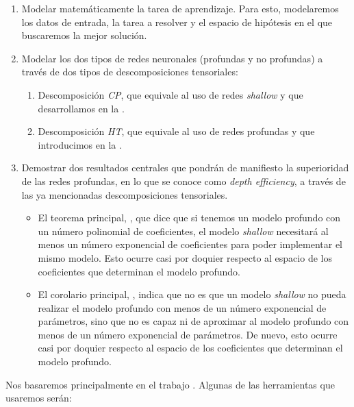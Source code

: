 \begin{enumerate}
	\item Modelar matemáticamente la tarea de aprendizaje. Para esto, modelaremos los datos de entrada, la tarea a resolver y el espacio de hipótesis en el que buscaremos la mejor solución.
	\item Modelar los dos tipos de redes neuronales (profundas y no profundas) a través de dos tipos de descomposiciones tensoriales:
	      \begin{enumerate}
		      \item Descomposición \textit{CP}, que equivale al uso de redes \textit{shallow}  y que desarrollamos en la .
		      \item Descomposición \textit{HT}, que equivale al uso de redes profundas y que introducimos en la .
	      \end{enumerate}
	\item Demostrar dos resultados centrales que pondrán de manifiesto la superioridad de las redes profundas, en lo que se conoce como \textit{depth efficiency}, a través de las ya mencionadas descomposiciones tensoriales.
	      \begin{itemize}
		      \item El teorema principal, , que dice que si tenemos un modelo profundo con un número polinomial de coeficientes, el modelo \textit{shallow} necesitará al menos un número exponencial de coeficientes para poder implementar el mismo modelo. Esto ocurre casi por doquier respecto al espacio de los coeficientes que determinan el modelo profundo.
		      \item El corolario principal, , indica que no es que un modelo \textit{shallow} no pueda realizar el modelo profundo con menos de un número exponencial de parámetros, sino que no es capaz ni de aproximar al modelo profundo con menos de un número exponencial de parámetros. De nuevo, esto ocurre casi por doquier respecto al espacio de los coeficientes que determinan el modelo profundo.
	      \end{itemize}
\end{enumerate}

Nos basaremos principalmente en el trabajo \cite{matematicas:principal}. Algunas de las herramientas que usaremos serán:

